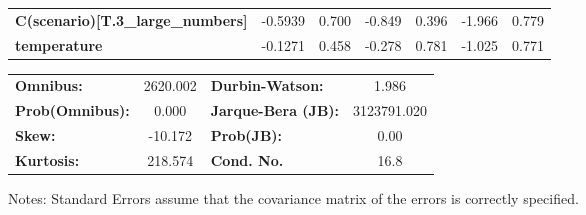 \begin{center}
\begin{tabular}{lcccccc}
\textbf{C(scenario)[T.3\_large\_numbers]} &      -0.5939  &        0.700     &    -0.849  &         0.396        &       -1.966    &        0.779     \\
\textbf{temperature}                      &      -0.1271  &        0.458     &    -0.278  &         0.781        &       -1.025    &        0.771     \\
\bottomrule
\end{tabular}
\begin{tabular}{lclc}
\textbf{Omnibus:}       & 2620.002 & \textbf{  Durbin-Watson:     } &      1.986   \\
\textbf{Prob(Omnibus):} &   0.000  & \textbf{  Jarque-Bera (JB):  } & 3123791.020  \\
\textbf{Skew:}          & -10.172  & \textbf{  Prob(JB):          } &       0.00   \\
\textbf{Kurtosis:}      & 218.574  & \textbf{  Cond. No.          } &       16.8   \\
\bottomrule
\end{tabular}
\end{center}

Notes: \newline
 [1] Standard Errors assume that the covariance matrix of the errors is correctly specified.